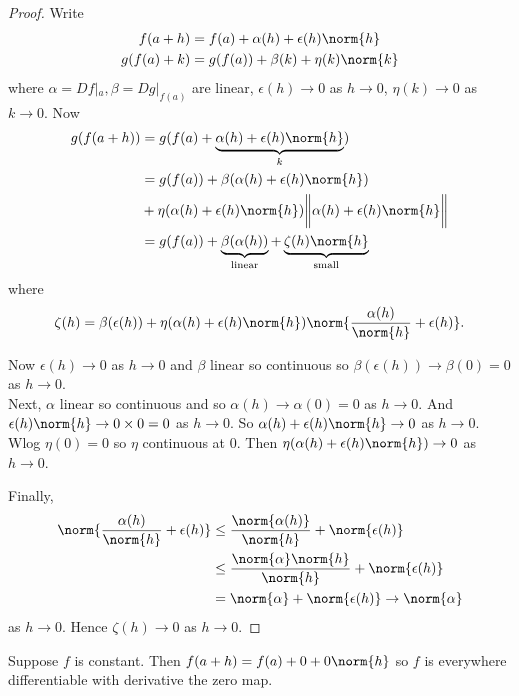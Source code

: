 \begin{proof}
Write
\begin{align*}
    f(a+h) &= f(a) + \alpha(h) + \epsilon(h) \norm{h} \\
    g(f(a)+k) &= g(f(a)) + \beta(k) + \eta(k)\norm{k}
\end{align*}
where $\alpha = Df|_a, \beta = Dg|_{f(a)}$ are linear, $\epsilon(h) \to 0$ as $h\to 0$,  $\eta(k)\to 0 $ as $k\to 0$. Now
\begin{align*}
    g(f(a+h)) &= g(f(a) + \underbrace{\alpha(h) + \epsilon(h) \norm{h}}_k) \\
    &= g(f(a)) + \beta(\alpha(h) + \epsilon(h) \norm{h}) \\
    &+ \eta(\alpha(h) + \epsilon(h) \norm{h}) \bigg\lVert \alpha(h) + \epsilon(h) \norm{h} \bigg\rVert \\
    & = g(f(a)) + \underbrace{\beta(\alpha(h))}_{\textup{linear}} + \underbrace{\zeta(h) \norm{h}}_{\textup{small}}
\end{align*}
where \[ \zeta(h) = \beta(\epsilon(h)) + \eta(\alpha(h) + \epsilon(h) \norm{h}) \norm{ \frac{\alpha(h)}{\norm{h}} + \epsilon(h)}. \]

Now $\epsilon(h) \to 0$ as $h\to 0$ and $\beta$ linear so continuous so $\beta(\epsilon(h)) \to \beta(0) = 0$ as $h\to 0$. \\
Next, $\alpha$ linear so continuous and so $\alpha(h) \to \alpha(0) = 0$ as $h \to 0$.
And $\epsilon(h) \norm{h} \to 0 \times 0 = 0$ as $h \to 0$.
So $\alpha(h) + \epsilon(h) \norm{h} \to 0$ as $h\to 0$. \\
Wlog $\eta(0) = 0$ so $\eta$ continuous at $0$.
Then $\eta (\alpha(h) + \epsilon(h) \norm{h}) \to 0$ as $h\to 0$.

Finally,
\begin{align*}
    \norm{ \frac{\alpha(h)}{\norm{h}} + \epsilon(h)} &\leq \frac{\norm{\alpha(h)}}{\norm{h}} + \norm{\epsilon(h)} \\
    &\leq \frac{\norm{\alpha} \norm{h}}{\norm{h}} + \norm{\epsilon(h)} \\
    &= \norm{\alpha} + \norm{\epsilon(h)} \to \norm{\alpha}
\end{align*}
as $h\to 0$. Hence $\zeta(h)\to 0 $ as $h\to 0$.
\end{proof}

\begin{example}
Suppose $f$ is constant. Then $f(a+h) = f(a) + 0 + 0\norm{h}$ so $f$ is everywhere differentiable with derivative the zero map.
\end{example}

